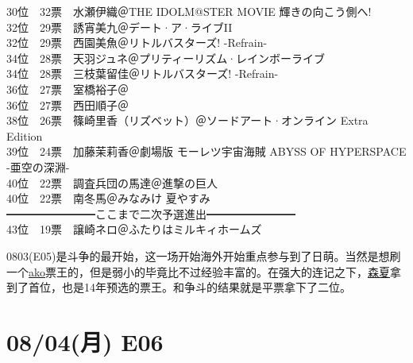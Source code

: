 { 30位　32票　水瀬伊織＠THE IDOLM@STER MOVIE 輝きの向こう側へ!\\
 32位　29票　誘宵美九＠デート·ア·ライブII\\
 32位　29票　西園美魚＠リトルバスターズ! -Refrain-\\
 34位　28票　天羽ジュネ＠プリティーリズム·レインボーライブ\\
 34位　28票　三枝葉留佳＠リトルバスターズ! -Refrain-\\
 36位　27票　室橋裕子＠\Saki\\
 36位　27票　西田順子＠\Saki\\
 38位　26票　篠崎里香（リズベット）＠ソードアート·オンライン Extra Edition\\
 39位　24票　加藤茉莉香＠劇場版 モーレツ宇宙海賊 ABYSS OF HYPERSPACE -亜空の深淵-\\
 40位　22票　調査兵団の馬達＠進撃の巨人\\
 40位　22票　南冬馬＠みなみけ 夏やすみ\\
 ━━━━━━━━ここまで二次予選進出━━━━━━━━\\
 43位　19票　譲崎ネロ＠ふたりはミルキィホームズ
}

0803(E05)是斗争的最开始，这一场开始海外开始重点参与到了日萌。当然是想刷一个\uline{ako}票王的，但是弱小的毕竟比不过经验丰富的。在强大的连记之下，\uline{森夏}拿到了首位，也是14年预选的票王。和争斗的结果就是平票拿下了二位。

\section{08/04(月) E06}

